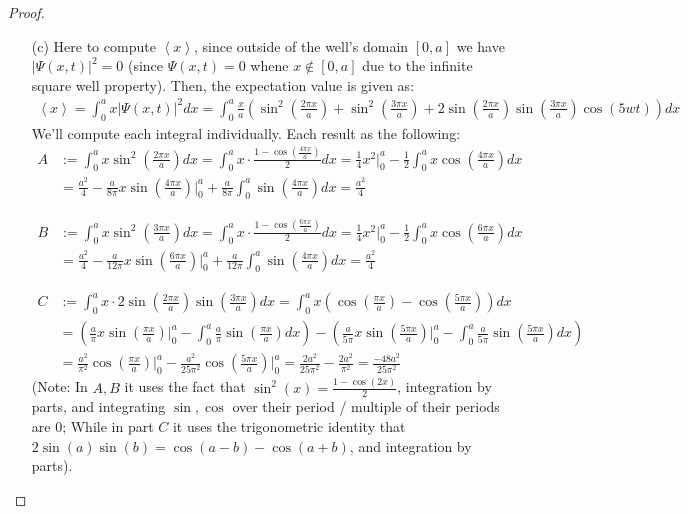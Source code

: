 \documentclass{article}
\begin{document}
\begin{proof}
\begin{itemize}
        \item[(c)] Here to compute $\left<x\right>$, since outside of the well's domain $[0,a]$ we have $|\Psi(x,t)|^2=0$ (since $\Psi(x,t)=0$ whene $x\notin [0,a]$ due to the infinite square well property). Then, the expectation value is given as:
        \begin{align}
            \left<x\right> = \int_{0}^{a}x|\Psi(x,t)|^2dx= \int_{0}^{a}\frac{x}{a}\left(\sin^2\left(\frac{2\pi x}{a}\right)+\sin^2\left(\frac{3\pi x}{a}\right)+2\sin\left(\frac{2\pi x}{a}\right)\sin\left(\frac{3\pi x}{a}\right)\cos(5wt)\right)dx
        \end{align}
        We'll compute each integral individually. Each result as the following:
        \begin{align}
            A&:=\int_{0}^{a}x\sin^2\left(\frac{2\pi x}{a}\right)dx = \int_{0}^{a}x\cdot \frac{1-\cos(\frac{4\pi x}{a})}{2}dx = \frac{1}{4}x^2\bigg|_{0}^{a}-\frac{1}{2}\int_{0}^{a}x\cos\left(\frac{4\pi x}{a}\right)dx\\
            &= \frac{a^2}{4} - \frac{a}{8\pi}x\sin\left(\frac{4\pi x}{a}\right)\bigg|_{0}^{a}+\frac{a}{8\pi}\int_{0}^{a}\sin\left(\frac{4\pi x}{a}\right)dx = \frac{a^2}{4}
        \end{align}

        \begin{align}
            B&:=\int_{0}^{a}x\sin^2\left(\frac{3\pi x}{a}\right)dx = \int_{0}^{a}x\cdot\frac{1-\cos(\frac{6\pi x}{a})}{2}dx = \frac{1}{4}x^2\bigg|_{0}^{a}-\frac{1}{2}\int_{0}^{a}x\cos\left(\frac{6\pi x}{a}\right)dx\\
            &= \frac{a^2}{4}-\frac{a}{12\pi}x\sin\left(\frac{6\pi x}{a}\right)\bigg|_{0}^{a}+\frac{a}{12\pi}\int_{0}^{a}\sin\left(\frac{4\pi x}{a}\right)dx = \frac{a^2}{4}
        \end{align}

        \begin{align}
            C&:= \int_{0}^{a}x\cdot 2\sin\left(\frac{2\pi x}{a}\right)\sin\left(\frac{3\pi x}{a}\right)dx=\int_{0}^{a}x\left(\cos\left(\frac{\pi x}{a}\right)-\cos\left(\frac{5\pi x}{a}\right)\right)dx\\
            &= \left(\frac{a}{\pi}x\sin\left(\frac{\pi x}{a}\right)\bigg|_{0}^{a}-\int_{0}^{a}\frac{a}{\pi}\sin\left(\frac{\pi x}{a}\right)dx\right)-\left(\frac{a}{5\pi}x\sin\left(\frac{5\pi x}{a}\right)\bigg|_{0}^{a}-\int_{0}^{a}\frac{a}{5\pi}\sin\left(\frac{5\pi x}{a}\right)dx\right)\\
            &= \frac{a^2}{\pi^2}\cos\left(\frac{\pi x}{a}\right)\bigg|_{0}^{a}-\frac{a^2}{25\pi^2}\cos\left(\frac{5\pi x}{a}\right)\bigg|_{0}^{a} = \frac{2a^2}{25\pi^2}-\frac{2a^2}{\pi^2} = \frac{-48a^2}{25\pi^2}
        \end{align}
        (Note: In $A,B$ it uses the fact that $\sin^2(x)=\frac{1-\cos(2x)}{2}$, integration by parts, and integrating $\sin,\cos$ over their period / multiple of their periods are $0$; While in part $C$ it uses the trigonometric identity that $2\sin(a)\sin(b)=\cos(a-b)-\cos(a+b)$, and integration by parts).


\end{itemize}
\end{proof}
\end{document}
